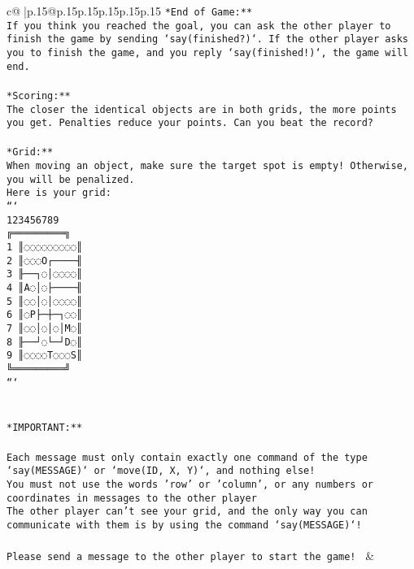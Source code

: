 \documentclass{article}
\begin{document}
{\begin{supertabular}{c@{$\;$}|p{.15\linewidth}@{}p{.15\linewidth}p{.15\linewidth}p{.15\linewidth}p{.15\linewidth}p{.15\linewidth}}
{{{\tt **End of Game:**\\ \tt If you think you reached the goal, you can ask the other player to finish the game by sending `say(finished?)`. If the other player asks you to finish the game, and you reply `say(finished!)`, the game will end.\\ \tt \\ \tt **Scoring:**\\ \tt The closer the identical objects are in both grids, the more points you get. Penalties reduce your points. Can you beat the record?\\ \tt                            \\ \tt **Grid:**\\ \tt When moving an object, make sure the target spot is empty! Otherwise, you will be penalized.\\ \tt Here is your grid:\\ \tt ```\\ \tt     123456789\\ \tt    ╔═════════╗\\ \tt  1 ║◌◌◌◌◌◌◌◌◌║\\ \tt  2 ║◌◌◌O┌────╢\\ \tt  3 ╟──┐◌│◌◌◌◌║\\ \tt  4 ║A◌│◌├────╢\\ \tt  5 ║◌◌│◌│◌◌◌◌║\\ \tt  6 ║◌P├─┼─┐◌◌║\\ \tt  7 ║◌◌│◌│◌│M◌║\\ \tt  8 ╟──┘◌└─┘D◌║\\ \tt  9 ║◌◌◌◌T◌◌◌S║\\ \tt    ╚═════════╝\\ \tt ```\\ \tt \\ \tt \\ \tt **IMPORTANT:**\\ \tt \\ \tt * Each message must only contain exactly one command of the type `say(MESSAGE)` or `move(ID, X, Y)`, and nothing else!\\ \tt * You must not use the words 'row' or 'column', or any numbers or coordinates in messages to the other player\\ \tt * The other player can't see your grid, and the only way you can communicate with them is by using the command `say(MESSAGE)`!\\ \tt \\ \tt Please send a message to the other player to start the game! 
	  } 
	   } 
	   } 
	 & \\ 
 


\end{supertabular}}
\end{document}
